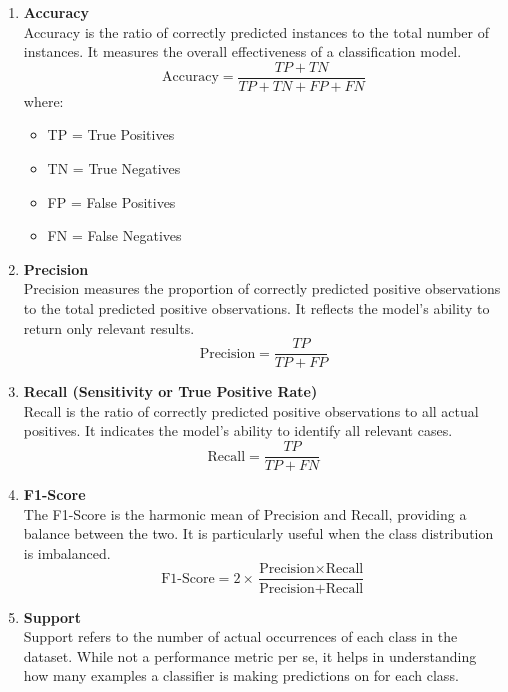 \begin{enumerate}
  \item \textbf{Accuracy} \\
        Accuracy is the ratio of correctly predicted instances to the total number of instances. It measures the overall effectiveness of a classification model.
        \[
          \text{Accuracy} = \frac{TP + TN}{TP + TN + FP + FN}
        \]
        where:
        \begin{itemize}
          \item TP = True Positives
          \item TN = True Negatives
          \item FP = False Positives
          \item FN = False Negatives
        \end{itemize}

  \item \textbf{Precision} \\
        Precision measures the proportion of correctly predicted positive observations to the total predicted positive observations. It reflects the model’s ability to return only relevant results.
        \[
          \text{Precision} = \frac{TP}{TP + FP}
        \]

  \item \textbf{Recall (Sensitivity or True Positive Rate)} \\
        Recall is the ratio of correctly predicted positive observations to all actual positives. It indicates the model’s ability to identify all relevant cases.
        \[
          \text{Recall} = \frac{TP}{TP + FN}
        \]

  \item \textbf{F1-Score} \\
        The F1-Score is the harmonic mean of Precision and Recall, providing a balance between the two. It is particularly useful when the class distribution is imbalanced.
        \[
          \text{F1-Score} = 2 \times \frac{\text{Precision} \times \text{Recall}}{\text{Precision} + \text{Recall}}
        \]

  \item \textbf{Support} \\
        Support refers to the number of actual occurrences of each class in the dataset. While not a performance metric per se, it helps in understanding how many examples a classifier is making predictions on for each class.
\end{enumerate}

